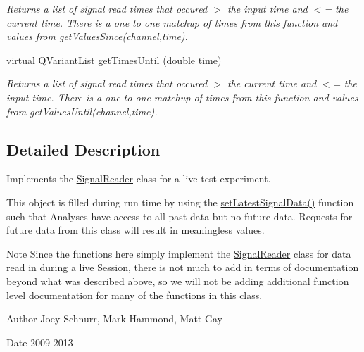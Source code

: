 \begin{DoxyCompactItemize}
\begin{DoxyCompactList}\small\item\em Returns a list of signal read times that occured $>$ the input time and $<$= the current time. There is a one to one matchup of times from this function and values from get\-Values\-Since(channel,time). \end{DoxyCompactList}\item 
\hypertarget{class_picto_1_1_live_signal_reader_aba43af8313cdd555ae78095caff7f619}{virtual Q\-Variant\-List \hyperlink{class_picto_1_1_live_signal_reader_aba43af8313cdd555ae78095caff7f619}{get\-Times\-Until} (double time)}\label{class_picto_1_1_live_signal_reader_aba43af8313cdd555ae78095caff7f619}

\begin{DoxyCompactList}\small\item\em Returns a list of signal read times that occured $>$ the current time and $<$= the input time. There is a one to one matchup of times from this function and values from get\-Values\-Until(channel,time). \end{DoxyCompactList}\end{DoxyCompactItemize}


\subsection{Detailed Description}
Implements the \hyperlink{class_picto_1_1_signal_reader}{Signal\-Reader} class for a live test experiment. 

This object is filled during run time by using the \hyperlink{class_picto_1_1_live_signal_reader_a45c4f89c02ea841e85911f4aa3574925}{set\-Latest\-Signal\-Data()} function such that Analyses have access to all past data but no future data. Requests for future data from this class will result in meaningless values. \begin{DoxyNote}{Note}
Since the functions here simply implement the \hyperlink{class_picto_1_1_signal_reader}{Signal\-Reader} class for data read in during a live Session, there is not much to add in terms of documentation beyond what was described above, so we will not be adding additional function level documentation for many of the functions in this class. 
\end{DoxyNote}
\begin{DoxyAuthor}{Author}
Joey Schnurr, Mark Hammond, Matt Gay 
\end{DoxyAuthor}
\begin{DoxyDate}{Date}
2009-\/2013 
\end{DoxyDate}


